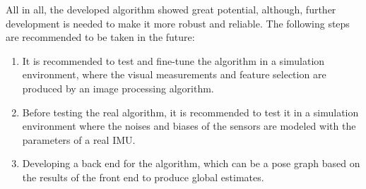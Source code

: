 All in all, the developed algorithm showed great potential, although, further development is needed to make it more robust and reliable. The following steps are recommended to be taken in the future:
\begin{enumerate}
    \item It is recommended to test and fine-tune the algorithm in a simulation environment, where the visual measurements and feature selection are produced by an image processing algorithm.
    \item Before testing the real algorithm, it is recommended to test it in a simulation environment where the noises and biases of the sensors are modeled with the parameters of a real IMU.
    \item Developing a back end for the algorithm, which can be a pose graph based on the results of the front end to produce global estimates.
\end{enumerate}